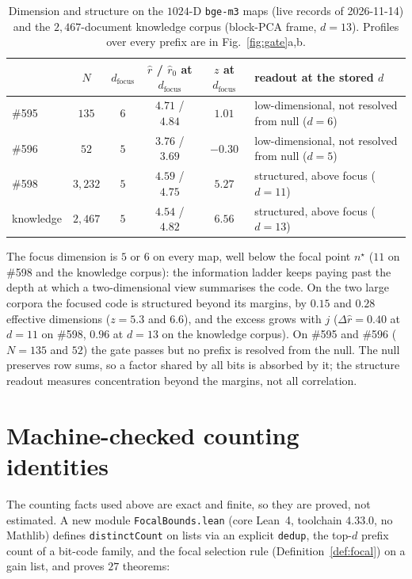 \documentclass[11pt,a4paper]{article}
\theoremstyle{plain}
\theoremstyle{remark}
\begin{document}
\begin{table}[h]
\centering
\small
\begin{tabular}{lcccc>{\raggedright\arraybackslash}p{4.2cm}}
\toprule
 & $N$ & $d_{\mathrm{focus}}$ & $\hat r$ / $\hat r_0$ at $d_{\mathrm{focus}}$ & $z$ at $d_{\mathrm{focus}}$ & readout at the stored $d$ \\
\midrule
\#595 & $135$ & $6$ & $4.71$ / $4.84$ & $1.01$ & low-dimensional, not resolved from null ($d=6$) \\
\#596 & $52$ & $5$ & $3.76$ / $3.69$ & $-0.30$ & low-dimensional, not resolved from null ($d=5$) \\
\#598 & $3{,}232$ & $5$ & $4.59$ / $4.75$ & $5.27$ & structured, above focus ($d=11$) \\
knowledge & $2{,}467$ & $5$ & $4.54$ / $4.82$ & $6.56$ & structured, above focus ($d=13$) \\
\bottomrule
\end{tabular}
\caption{Dimension and structure on the $1024$-D \texttt{bge-m3} maps (live records of 2026-11-14) and the $2{,}467$-document knowledge corpus (block-PCA frame, $d=13$). Profiles over every prefix are in Fig.~\ref{fig:gate}a,b.}
\label{tab:dimstruct}
\end{table}

The focus dimension is $5$ or $6$ on every map, well below the focal point $n^\star$ ($11$ on \#598 and the knowledge corpus): the information ladder keeps paying past the depth at which a two-dimensional view summarises the code. On the two large corpora the focused code is structured beyond its margins, by $0.15$ and $0.28$ effective dimensions ($z=5.3$ and $6.6$), and the excess grows with $j$ ($\Delta\hat r=0.40$ at $d=11$ on \#598, $0.96$ at $d=13$ on the knowledge corpus). On \#595 and \#596 ($N=135$ and $52$) the gate passes but no prefix is resolved from the null. The null preserves row sums, so a factor shared by all bits is absorbed by it; the structure readout measures concentration beyond the margins, not all correlation.

\section{Machine-checked counting identities}
\label{sec:lean}

The counting facts used above are exact and finite, so they are proved, not estimated. A new module \texttt{FocalBounds.lean} (core Lean~4, toolchain $4.33.0$, no Mathlib) defines \texttt{distinctCount} on lists via an explicit \texttt{dedup}, the top-$d$ prefix count of a bit-code family, and the focal selection rule (Definition~\ref{def:focal}) on a gain list, and proves $27$ theorems:
\end{document}
